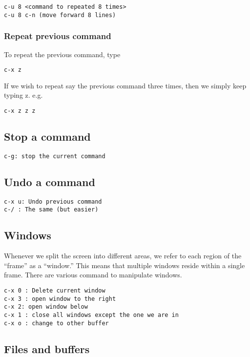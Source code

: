 \documentclass[a4paper, 10pt]{article}
\begin{document}
  \begin{verbatim}
c-u 8 <command to repeated 8 times>
c-u 8 c-n (move forward 8 lines)
 \end{verbatim}

\subsubsection*{Repeat previous command}
\label{sec:repe-prev-comm}

To repeat the previous command, type 
\begin{verbatim}
c-x z
\end{verbatim}
If we wish to repeat say the previous command three times, then we
simply keep typing z. e.g.
\begin{verbatim}
c-x z z z 
\end{verbatim}

 \subsection*{Stop a command}
 
  \begin{verbatim}
c-g: stop the current command
 \end{verbatim}
 
 \subsection*{Undo a command}
 
  \begin{verbatim}
c-x u: Undo previous command
c-/ : The same (but easier)
 \end{verbatim}
 
\subsection*{Windows}
  
Whenever we split the screen into different areas, we refer to each region of the ``frame'' as a ``window.'' This means that multiple windows reside within a single frame. There are various command to manipulate windows.  
  
\begin{verbatim}
c-x 0 : Delete current window
c-x 3 : open window to the right
c-x 2: open window below
c-x 1 : close all windows except the one we are in
c-x o : change to other buffer
 \end{verbatim}
 
\subsection*{Files and buffers}
\end{document}
